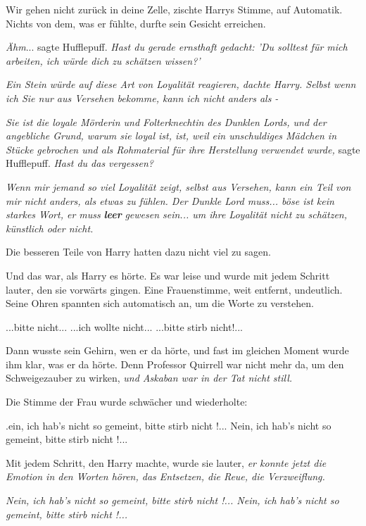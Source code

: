 \glqq{}Wir gehen nicht zurück in deine Zelle\grqq{}, zischte Harrys Stimme, auf
Automatik. Nichts von dem, was er fühlte, durfte sein Gesicht erreichen.

\emph{Ähm}... sagte Hufflepuff. \emph{Hast du gerade ernsthaft gedacht: 'Du
solltest für mich arbeiten, ich würde dich zu schätzen wissen?'}

\emph{Ein Stein würde auf diese Art von Loyalität reagieren, dachte Harry.
Selbst wenn ich Sie nur aus Versehen bekomme, kann ich nicht anders als -}

\emph{Sie ist die loyale Mörderin und Folterknechtin des Dunklen Lords, und der
angebliche Grund, warum sie loyal ist, ist, weil ein unschuldiges Mädchen in
Stücke gebrochen und als Rohmaterial für ihre Herstellung verwendet wurde,
}sagte Hufflepuff. \emph{Hast du das vergessen?}

\emph{Wenn mir jemand so viel Loyalität zeigt, selbst aus Versehen, kann ein
Teil von mir nicht anders, als etwas zu fühlen. Der Dunkle Lord muss... böse ist
kein starkes Wort, er muss} \textbf{\emph{leer}}\emph{ gewesen sein... um ihre
Loyalität nicht zu schätzen, künstlich oder nicht.}

Die besseren Teile von Harry hatten dazu nicht viel zu sagen.

Und das war, als Harry es hörte. Es war leise und wurde mit jedem Schritt
lauter, den sie vorwärts gingen. Eine Frauenstimme, weit entfernt, undeutlich.
Seine Ohren spannten sich automatisch an, um die Worte zu verstehen.

\glqq{}...bitte nicht...\grqq{} \glqq{}...ich wollte nicht...\grqq{} \glqq{}
...bitte stirb nicht!...\grqq{}

Dann wusste sein Gehirn, wen er da hörte, und fast im gleichen Moment wurde ihm
klar, was er da hörte. Denn Professor Quirrell war nicht mehr da, um den
Schweigezauber zu wirken, \emph{und Askaban war in der Tat nicht still.}

Die Stimme der Frau wurde schwächer und wiederholte:

\grqq{}.ein, ich hab's nicht so
gemeint, bitte stirb nicht !...\grqq{} \glqq{}Nein, ich hab's nicht so gemeint,
bitte stirb nicht !...\grqq{}

Mit jedem Schritt, den Harry machte, wurde sie lauter, \emph{er konnte jetzt die
Emotion in den Worten hören, das Entsetzen, die Reue, die Verzweiflung.}

\emph{\glqq{}Nein, ich hab's nicht so
gemeint, bitte stirb nicht !...\grqq{} \glqq{}Nein, ich hab's nicht so gemeint,
bitte stirb nicht !...\grqq{}}

